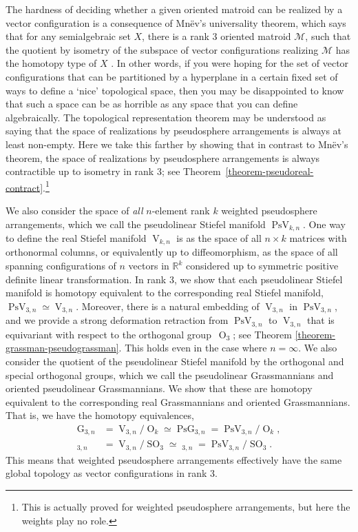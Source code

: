 \documentclass[JEP,XML,SOM,Unicode,NoFloatCountersInSection,published]{cedram}
\theoremstyle{remark}
\let\mc\mathcal
\DeclareMathOperator{\pg}{PsG}
\DeclareMathOperator{\pog}{Ps\widetilde G}
\DeclareMathOperator{\g}{G}
\DeclareMathOperator{\oG}{\widetilde G}
\DeclareMathOperator{\orth}{O}
\DeclareMathOperator{\sorth}{SO}
\DeclareMathOperator{\stief}{V}
\DeclareMathOperator{\pstief}{PsV}
\begin{document}
The hardness of deciding whether a given oriented matroid can be realized by a vector configuration is a consequence of Mnëv's universality theorem, which says that for any semialgebraic set $X$, there is a rank $3$ oriented matroid $\mc{M}$, such that the quotient by isometry of the subspace of vector configurations realizing $\mc{M}$ has the homotopy type of $X$ \cite{mnev1988universality}.
In other words, if you were hoping for the set of vector configurations that can be partitioned by a hyperplane in a certain fixed set of ways to define a `nice' topological space, then you may be disappointed to know that such a space can be as horrible as any space that you can define algebraically.
The topological representation theorem may be understood as saying that the space of realizations by pseudosphere arrangements is always at least non-empty.
Here we take this farther by showing that in contrast to Mnëv's theorem, the space of realizations by pseudosphere arrangements is always contractible up to isometry in rank 3; see Theorem~\ref{theorem-pseudoreal-contract}.\footnote{This is actually proved for weighted pseudosphere arrangements, but here the weights play no role.}

We also consider the space of \emph{all} $n$-element rank $k$ weighted pseudosphere arrangements, which we call the pseudolinear Stiefel manifold $\pstief_{k,n}$.
One way to define the real Stiefel manifold $\stief_{k,n}$ is as the space of all $n \times k$ matrices with orthonormal columns, or equivalently up to diffeomorphism, as the space of all spanning configurations of $n$ vectors in $\mathbb{R}^k$ considered up to symmetric positive definite linear transformation.
In rank 3, we show that each pseudolinear Stiefel manifold is homotopy equivalent to the corresponding real Stiefel manifold, $\pstief_{3,n} \simeq \stief_{3,n}$.
Moreover, there is a natural embedding of $\stief_{3,n}$ in $\pstief_{3,n}$, and we provide a strong deformation retraction from $\pstief_{3,n}$ to $\stief_{3,n}$ that is equivariant with respect to the orthogonal group~$\orth_3$; see Theorem \ref{theorem-grassman-pseudograssman}.
This holds even in the case where $n = \infty$.
We also consider the quotient of the pseudolinear Stiefel manifold by the orthogonal and special orthogonal groups, which we call the pseudolinear Grassmannians and oriented pseudolinear Grassmannians. We show that these are homotopy equivalent to the corresponding real Grassmannians and oriented Grassmannians.
That is, we have the homotopy equivalences,
\begin{align*}
\g_{3,n} &= \stief_{3,n} / \orth_k \simeq \pg_{3,n} = \pstief_{3,n} / \orth_k, \\
\oG_{3,n} &= \stief_{3,n} / \sorth_3 \simeq \pog_{3,n} = \pstief_{3,n} / \sorth_3.
\end{align*}
This means that weighted pseudosphere arrangements effectively have the same global topology as vector configurations in rank 3.
\end{document}
